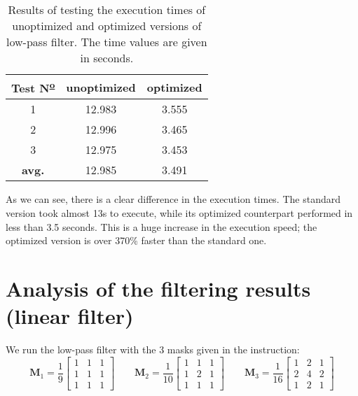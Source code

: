 \documentclass[12pt]{article}
\begin{document}
\begin{table}[ht]\centering
    \begin{tabular}{ccc}
        \toprule
        Test N\textsuperscript{\underline{o}} & unoptimized & optimized \\\midrule
        1                                     & 12.983      & 3.555     \\
        2                                     & 12.996      & 3.465     \\
        3                                     & 12.975      & 3.453     \\\midrule
        \bf avg.                              & 12.985      & 3.491     \\
        \bottomrule
    \end{tabular}
    \caption{Results of testing the execution times of unoptimized and optimized versions of low-pass filter.
        The time values are given in seconds.}
    \label{tab:lowpass-execution-time}
\end{table}

As we can see, there is a clear difference in the execution times.
The standard version took almost 13s to execute, while its optimized counterpart performed in less than 3.5 seconds.
This is a huge increase in the execution speed; the optimized version is over 370\% faster than the standard one.

\section{Analysis of the filtering results (linear filter)}

We run the low-pass filter with the 3 masks given in the instruction:
\begin{equation*}
    \mathbf{M}_1 = \frac{1}{9}\begin{bmatrix}
        1 & 1 & 1 \\
        1 & 1 & 1 \\
        1 & 1 & 1
    \end{bmatrix}
    \qquad
    \mathbf{M}_2 = \frac{1}{10}\begin{bmatrix}
        1 & 1 & 1 \\
        1 & 2 & 1 \\
        1 & 1 & 1
    \end{bmatrix}
    \qquad
    \mathbf{M}_3 = \frac{1}{16}\begin{bmatrix}
        1 & 2 & 1 \\
        2 & 4 & 2 \\
        1 & 2 & 1
    \end{bmatrix}
\end{equation*}
\end{document}
